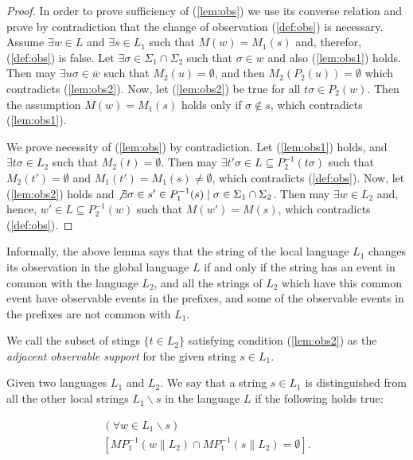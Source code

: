 \documentclass[letterpaper, 10pt, conference]{ieeeconf}
\begin{document}
\begin{proof}
In order to prove sufficiency of (\ref{lem:obs}) we use its converse relation
and prove by contradiction that the change of observation (\ref{def:obs}) is
necessary.
Assume $\exists w \in L$ and $\exists s \in L_1$ such that
$M(w)= M_1(s)$ and, therefor, (\ref{def:obs}) is false. Let $\exists
\sigma \in \Sigma_1 \cap \Sigma_2$ such that $\sigma \in w$ and also
(\ref{lem:obs1}) holds. Then may $\exists u \sigma \in \overline{w}$ such that
$M_2(u) = \emptyset$, and then $M_2(P_2(u)) =
\emptyset$ which contradicts (\ref{lem:obs2}). Now, let (\ref{lem:obs2})
be true for all $t\sigma \in P_2(w)$. Then the assumption $M(w)=
M_1(s)$ holds only if $\sigma \not \in s$, which contradicts (\ref{lem:obs1}). 

We prove necessity of (\ref{lem:obs}) by contradiction.
Let (\ref{lem:obs1}) holds, and $\exists t\sigma \in L_2$ such that
$M_2(t) = \emptyset$. Then may $\exists t'\sigma \in 
L \subseteq P_2^{-1}(t\sigma)$ such that $M_2(t') =
\emptyset$ and $M_1(t') = M_1(s) \neq \emptyset$, which contradicts
(\ref{def:obs}).
Now, let (\ref{lem:obs2}) holds and $\not \exists \sigma \in s' \in P_1^{-1}(s)
\mid \sigma \in \Sigma_1 \cap \Sigma_2$. Then may $\exists w \in L_2$ and,
hence, $w' \in L \subseteq P_2^{-1}(w)$ such that $M(w')=M(s)$,
which contradicts (\ref{def:obs}).
\end{proof}

Informally, the above lemma says that the string of the local language $L_1$
changes its observation in the global language $L$ if and only if the string has
an event in common with the language $L_2$, and all the strings of $L_2$ which
have this common event have observable events in the prefixes, and some of the
observable events in the prefixes are not common with $L_1$.

We call the subset of stings $\{t \in L_2\}$ satisfying condition
(\ref{lem:obs2}) as the \emph{adjacent observable support} for the given string
$s \in L_1$.

\begin{definition} Given two languages $L_1$ and $L_2$. We say that a string $s
\in L_{1}$ is distinguished from all the other local strings $L_1\backslash s$
in the language $L$ if the following holds true:
\end{definition}
\begin{equation}
\label{def:dist}
\begin{array}{l}
  (\forall w \in L_1\backslash s)\\
  	\left[ MP_1^{-1}(w \parallel L_2) \cap MP_1^{-1}(s\parallel L_2) = \emptyset
  	\right].
\end{array}
\end{equation}
\end{document}
